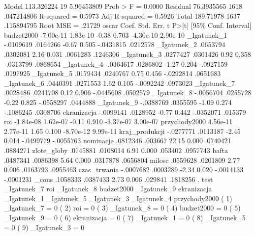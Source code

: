 \begin{stlog}
       Model {\VBAR}  113.326224    19  5.96453809           Prob > F      =  0.0000
    Residual {\VBAR}  76.3935565  1618  .047214806           R-squared     =  0.5973
           Adj R-squared =  0.5926
       Total {\VBAR}   189.71978  1637  .115894795           Root MSE      =  .21729
{\smallskip}
         oscar {\VBAR}      Coef.   Std. Err.      t    P>|t|     [95\% Conf. Interval]
    budzet2000 {\VBAR}  -7.00e-11   1.83e-10    -0.38   0.703    -4.30e-10    2.90e-10
   _Igatunek_1 {\VBAR}  -.0109619   .0164266    -0.67   0.505    -.0431815    .0212578
   _Igatunek_2 {\VBAR}   .0653794   .0302081     2.16   0.031     .0061283    .1246306
   _Igatunek_3 {\VBAR}   .0277427   .0301426     0.92   0.358    -.0313799    .0868654
   _Igatunek_4 {\VBAR}  -.0364617   .0286802    -1.27   0.204    -.0927159    .0197925
   _Igatunek_5 {\VBAR}   .0179434   .0240767     0.75   0.456    -.0292814    .0651683
   _Igatunek_6 {\VBAR}   .0440391   .0271553     1.62   0.105    -.0092242    .0973023
   _Igatunek_7 {\VBAR}   .0028486   .0241708     0.12   0.906    -.0445608    .0502579
   _Igatunek_8 {\VBAR}  -.0056704   .0255728    -0.22   0.825    -.0558297    .0444888
   _Igatunek_9 {\VBAR}  -.0388769   .0355595    -1.09   0.274    -.1086245    .0308706
   ekranizacja {\VBAR}  -.0099141   .0128952    -0.77   0.442    -.0352071     .015379
           roi {\VBAR}  -1.84e-08   1.62e-07    -0.11   0.910    -3.37e-07    3.00e-07
 przychody2000 {\VBAR}   4.56e-11   2.77e-11     1.65   0.100    -8.70e-12    9.99e-11
kraj_produkcji {\VBAR}  -.0277771   .0113187    -2.45   0.014    -.0499779   -.0055763
     nominacje {\VBAR}   .0812346    .003667    22.15   0.000     .0740421    .0884271
   zlote_globy {\VBAR}   .0745881   .0108014     6.91   0.000      .053402    .0957743
         bafta {\VBAR}   .0487341   .0086398     5.64   0.000     .0317878    .0656804
        milosc {\VBAR}   .0559628   .0201809     2.77   0.006     .0163793    .0955463
  czas_trwania {\VBAR}  -.0007682   .0003289    -2.34   0.020    -.0014133   -.0001231
         _cons {\VBAR}   .1058333   .0387433     2.73   0.006      .029841    .1818256
{\smallskip}
. test _Igatunek_7 roi _Igatunek_8 budzet2000 _Igatunek_9 ekranizacja _Igatunek_1  _Igatunek_5 _Igatunek_3
 _Igatunek_4 przychody2000
{\smallskip}
 ( 1)  _Igatunek_7 = 0
 ( 2)  roi = 0
 ( 3)  _Igatunek_8 = 0
 ( 4)  budzet2000 = 0
 ( 5)  _Igatunek_9 = 0
 ( 6)  ekranizacja = 0
 ( 7)  _Igatunek_1 = 0
 ( 8)  _Igatunek_5 = 0
 ( 9)  _Igatunek_3 = 0

\end{stlog}
